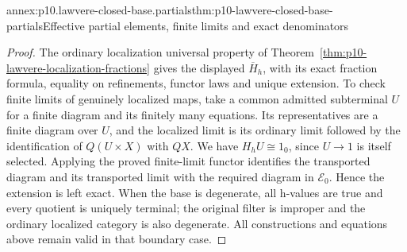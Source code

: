 \begin{annexitem}{annex:p10.lawvere-closed-base.partials}{thm:p10-lawvere-closed-base-partials}{Effective partial elements, finite limits and exact denominators}
\begin{proof}
The ordinary localization universal property of
Theorem~\ref{thm:p10-lawvere-localization-fractions} gives the displayed
\(\overline H_h\), with its exact fraction formula, equality on
refinements, functor laws and unique extension. To check finite limits
of genuinely localized maps, take a common admitted subterminal \(U\)
for a finite diagram and its finitely many equations. Its representatives
are a finite diagram over \(U\), and the localized limit is its
ordinary limit followed by the identification of \(Q(U\times X)\)
with \(QX\). We have \(H_hU\cong1_0\), since \(U\to1\)
is itself selected. Applying the proved finite-limit functor identifies
the transported diagram and its transported limit with the required
diagram in \(\mathcal E_0\). Hence the extension is left exact.
When the base is degenerate, all h-values are true and every quotient
is uniquely terminal; the original filter is improper and the ordinary
localized category is also degenerate. All constructions and equations
above remain valid in that boundary case.
\end{proof}
\end{annexitem}


